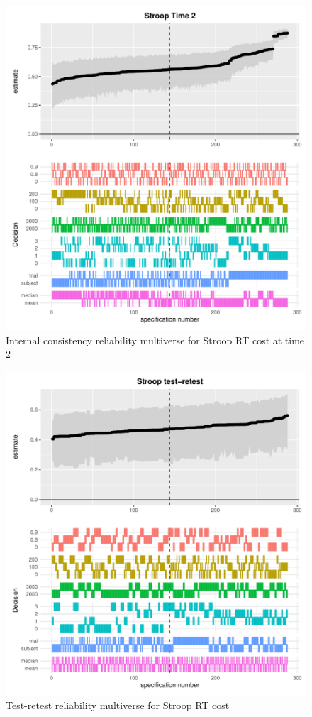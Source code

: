 \documentclass[
  english,
  man,floatsintext]{apa6}
\begin{document}
\begin{figure}
\centering
\includegraphics{half_trials_files/figure-latex/unnamed-chunk-2-1.pdf}
\caption{\label{fig:unnamed-chunk-2}Internal consistency reliability multiverse for Stroop RT cost at time 2}
\end{figure}

\begin{figure}
\centering
\includegraphics{half_trials_files/figure-latex/unnamed-chunk-3-1.pdf}
\caption{\label{fig:unnamed-chunk-3}Test-retest reliability multiverse for Stroop RT cost}
\end{figure}
\end{document}
